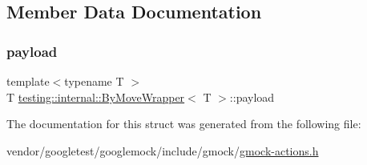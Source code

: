 \subsection{Member Data Documentation}
\mbox{\label{structtesting_1_1internal_1_1_by_move_wrapper_ae8407b1ae99db3f00797d68b9ee9e870}} 
\subsubsection{\texorpdfstring{payload}{payload}}
{\footnotesize\ttfamily template$<$typename T $>$ \\
T \hyperlink{structtesting_1_1internal_1_1_by_move_wrapper}{testing\+::internal\+::\+By\+Move\+Wrapper}$<$ T $>$\+::payload}



The documentation for this struct was generated from the following file\+:\begin{DoxyCompactItemize}
\item 
vendor/googletest/googlemock/include/gmock/\hyperlink{gmock-actions_8h}{gmock-\/actions.\+h}\end{DoxyCompactItemize}
